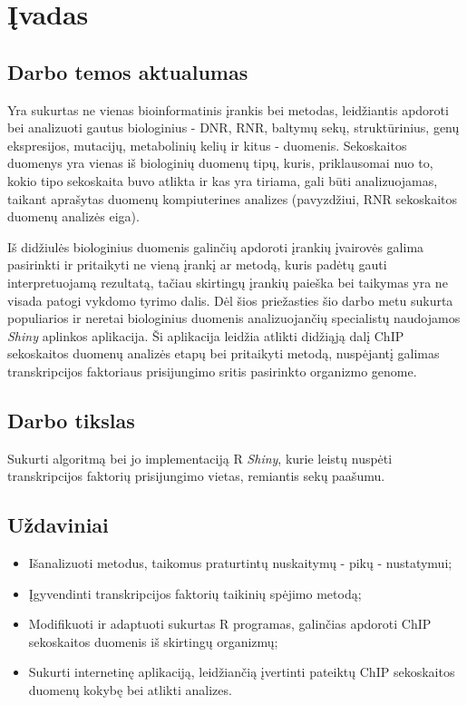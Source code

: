 \documentclass[12pt]{article}
\begin{document}

\section{Įvadas}
\subsection*{Darbo temos aktualumas}
Yra sukurtas ne vienas bioinformatinis įrankis\cite{BIOTOOLS} bei metodas,
leidžiantis apdoroti bei analizuoti gautus biologinius - DNR, RNR, baltymų sekų,
struktūrinius, genų ekspresijos, mutacijų, metabolinių kelių ir kitus -
duomenis. Sekoskaitos duomenys yra vienas iš biologinių duomenų tipų, kuris,
priklausomai nuo to, kokio tipo sekoskaita buvo atlikta ir kas yra tiriama, gali
būti analizuojamas, taikant aprašytas duomenų kompiuterines analizes
(pavyzdžiui, RNR sekoskaitos duomenų analizės eiga\cite{RNASEQ}).

Iš didžiulės biologinius duomenis galinčių apdoroti įrankių įvairovės galima
pasirinkti ir pritaikyti ne vieną įrankį ar metodą, kuris padėtų gauti
interpretuojamą rezultatą, tačiau skirtingų įrankių paieška bei taikymas yra ne
visada patogi vykdomo tyrimo dalis. Dėl šios priežasties šio darbo metu
sukurta populiarios ir neretai biologinius duomenis analizuojančių specialistų
naudojamos \emph{Shiny} aplinkos aplikacija. Ši aplikacija leidžia atlikti
didžiąją dalį ChIP sekoskaitos duomenų analizės etapų bei pritaikyti metodą,
nuspėjantį galimas transkripcijos faktoriaus prisijungimo sritis pasirinkto 
organizmo genome.

\subsection*{Darbo tikslas}
Sukurti algoritmą bei jo implementaciją R \emph{Shiny}, kurie leistų nuspėti
transkripcijos faktorių prisijungimo vietas, remiantis sekų paašumu.

\subsection*{Uždaviniai}
\begin{itemize}
    \item Išanalizuoti metodus, taikomus praturtintų nuskaitymų - pikų -
          nustatymui;
    \item Įgyvendinti transkripcijos faktorių taikinių spėjimo metodą;
    \item Modifikuoti ir adaptuoti sukurtas R programas, galinčias apdoroti
          ChIP sekoskaitos duomenis iš skirtingų organizmų;          
    \item Sukurti internetinę aplikaciją, leidžiančią įvertinti pateiktų
          ChIP sekoskaitos duomenų kokybę bei atlikti analizes.

\end{itemize}
\end{document}
